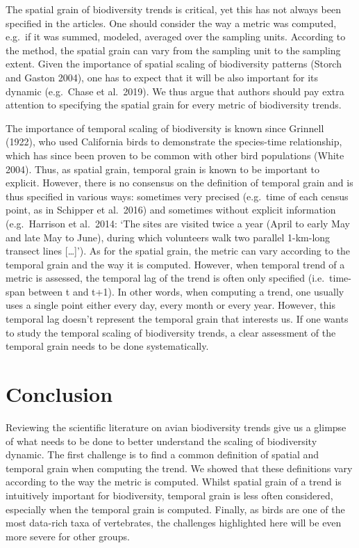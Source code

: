 \documentclass[
  12pt,
  oneside]{report}
\begin{document}
The spatial grain of biodiversity trends is critical, yet this has not always been specified in the articles. One should consider the way a metric was computed, e.g.~if it was summed, modeled, averaged over the sampling units. According to the method, the spatial grain can vary from the sampling unit to the sampling extent. Given the importance of spatial scaling of biodiversity patterns (Storch and Gaston 2004), one has to expect that it will be also important for its dynamic (e.g.~Chase et al.~2019). We thus argue that authors should pay extra attention to specifying the spatial grain for every metric of biodiversity trends.

The importance of temporal scaling of biodiversity is known since Grinnell (1922), who used California birds to demonstrate the species-time relationship, which has since been proven to be common with other bird populations (White 2004). Thus, as spatial grain, temporal grain is known to be important to explicit. However, there is no consensus on the definition of temporal grain and is thus specified in various ways: sometimes very precised (e.g.~time of each census point, as in Schipper et al.~2016) and sometimes without explicit information (e.g.~Harrison et al.~2014: `The sites are visited twice a year (April to early May and late May to June), during which volunteers walk two parallel 1-km-long transect lines {[}\ldots{]}'). As for the spatial grain, the metric can vary according to the temporal grain and the way it is computed. However, when temporal trend of a metric is assessed, the temporal lag of the trend is often only specified (i.e.~time-span between t and t+1). In other words, when computing a trend, one usually uses a single point either every day, every month or every year. However, this temporal lag doesn't represent the temporal grain that interests us. If one wants to study the temporal scaling of biodiversity trends, a clear assessment of the temporal grain needs to be done systematically.

\hypertarget{conclusion}{%
\chapter{Conclusion}\label{conclusion}}

Reviewing the scientific literature on avian biodiversity trends give us a glimpse of what needs to be done to better understand the scaling of biodiversity dynamic. The first challenge is to find a common definition of spatial and temporal grain when computing the trend. We showed that these definitions vary according to the way the metric is computed. Whilst spatial grain of a trend is intuitively important for biodiversity, temporal grain is less often considered, especially when the temporal grain is computed. Finally, as birds are one of the most data-rich taxa of vertebrates, the challenges highlighted here will be even more severe for other groups.
\end{document}
